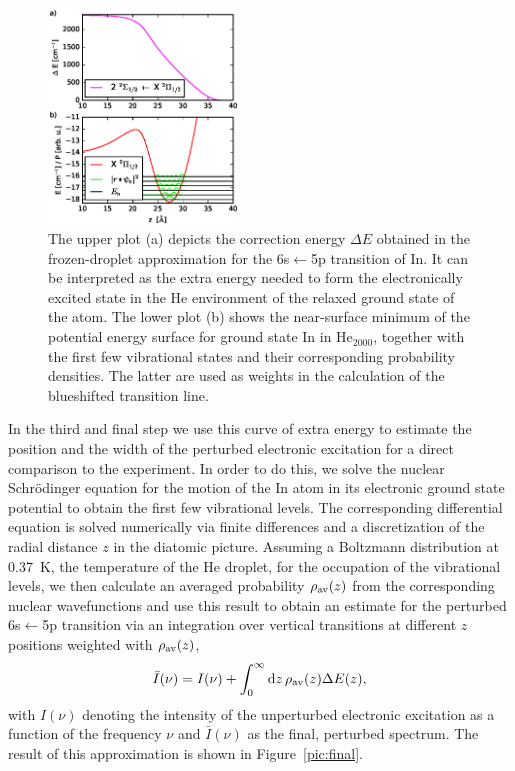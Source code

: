 \documentclass[twoside,twocolumn,9pt]{article}
\begin{document}
\begin{figure}[htbp!]
  	\begin{center}
 		\includegraphics[width=0.45\textwidth]{6.eps}
                \caption{The upper plot (a) depicts the correction energy $\Delta{}E$ obtained in the frozen-droplet approximation for the  6s$\leftarrow{}$5p transition of In. It can be interpreted as the extra energy needed to form the electronically excited state in the He environment of the relaxed ground state of the atom. The lower plot (b) shows the near-surface minimum of the potential energy surface for ground state In in He$_{2000}$, together with the first few vibrational states and their corresponding probability densities. The latter are used as weights in the calculation of the blueshifted transition line. \label{pic:extra}}
  	\end{center}
\end{figure}

In the third and final step we use this curve of extra energy to estimate the position and the width of the perturbed electronic excitation for a direct comparison to the experiment. In order to do this, we solve the nuclear Schr\"odinger equation for the motion of the In atom in its electronic ground state potential to obtain the first few vibrational levels. The corresponding differential equation is solved numerically via finite differences and a discretization of the radial distance $z$ in the diatomic picture. Assuming a Boltzmann distribution at 0.37~K, the temperature of the He droplet, for the occupation of the vibrational levels, we then calculate an averaged probability $\rho{}_{\rm av}(z)$ from the corresponding nuclear wavefunctions and use this result to obtain an estimate for the perturbed  6s$\leftarrow{}$5p transition via an integration over vertical transitions at different $z$ positions weighted with $\rho{}_{\rm av}(z)$,
\begin{equation}
\bar{I}(\nu) = I(\nu) +  \int_{0}^{\infty} \mathrm{d}z\,\rho{}_{\rm av}(z) \Delta{}E(z),
\end{equation}
with  $I(\nu)$ denoting the intensity of the unperturbed electronic excitation as a  function of the frequency $\nu$ and $\bar{I}(\nu)$ as the final, perturbed spectrum. The result of this approximation is shown in Figure~\ref{pic:final}.
\end{document}
